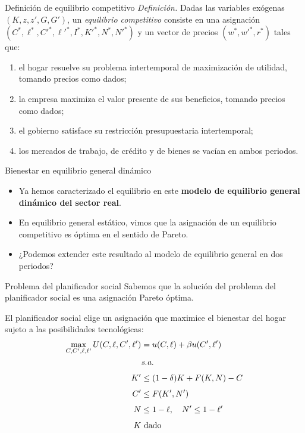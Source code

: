 \documentclass[aspectratio=169,11pt]{beamer}
\begin{document}
\begin{frame}{Definición de equilibrio competitivo}
  \small
  \textit{Definición.} Dadas las variables exógenas \((K,z,z',G,G')\), un \textit{equilibrio competitivo} consiste en una asignación $(C^*, \ell^*, C'^{*}, \ell'^{*}, I^*, K'^{*}, N^*, N'^{*})$ y un vector de precios $(w^*, w'^{*}, r^*)$ tales que:
  \begin{enumerate}
    \setlength{\itemsep}{0.48em}
    \item el hogar resuelve su problema intertemporal de maximización de utilidad, tomando precios como dados;
    \item la empresa maximiza el valor presente de sus beneficios, tomando precios como dados;
    \item el gobierno satisface su restricción presupuestaria intertemporal;
    \item los mercados de trabajo, de crédito y de bienes se vacían en ambos periodos.
  \end{enumerate}
\end{frame}

\begin{frame}{Bienestar en equilibrio general dinámico}
  \begin{itemize}
    \item Ya hemos caracterizado el equilibrio en este \textbf{modelo de equilibrio general dinámico del sector real}.
    \item En equilibrio general estático, vimos que la asignación de un equilibrio competitivo es óptima en el sentido de Pareto.
    \item ¿Podemos extender este resultado al modelo de equilibrio general en dos periodos?
  \end{itemize}
\end{frame}

\begin{frame}{Problema del planificador social}
  Sabemos que la solución del problema del planificador social es una asignación Pareto óptima.

  \vspace{0.4cm}

  El planificador social elige un asignación que maximice el bienestar del hogar sujeto a las posibilidades tecnológicas:
  \small
  \begin{align*}
    \max_{C,C',\ell,\ell'} U(C,\ell,C',\ell') &= u(C, \ell) + \beta u(C', \ell')\\
    &\text{\textit{s.a.}} \\[4pt]
    K' &\leq (1-\delta)K + F(K,N) - C \\[4pt]
    C' &\leq F(K',N') \\[4pt]
    N &\leq 1 - \ell, \quad N' \leq 1 - \ell' \\[4pt]
    K &\text{ dado }
  \end{align*}
\end{frame}
\end{document}
